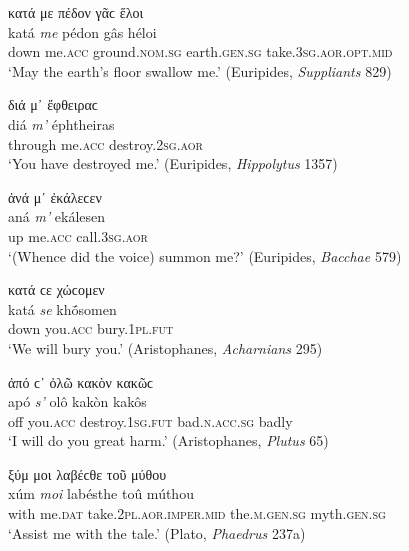 \begin{exe}
\ex κατά με πέδον γᾶϲ ἕλοι\\
\gll katá \emph{me} pédon gâs héloi\\
down me.\textsc{acc} ground.\textsc{nom.sg} earth.\textsc{gen.sg}
take.\textsc{3sg.aor.opt.mid}\\
\trans `May the earth's floor swallow me.' (Euripides, \textit{Suppliants} 829)
\label{tmesis21}
\end{exe}

\begin{exe}
\ex διά μ᾽ ἔφθειραϲ\\
\gll diá \emph{m'} éphtheiras\\
through me.\textsc{acc} destroy.\textsc{2sg.aor}\\
\trans `You have destroyed me.' (Euripides, \textit{Hippolytus} 1357)
\label{tmesis22}
\end{exe}

\begin{exe}
\ex ἀνά μ᾽ ἐκάλεϲεν\\
\gll aná \emph{m'} ekálesen\\
up me.\textsc{acc} call.\textsc{3sg.aor}\\
\trans `(Whence did the voice) summon me?' (Euripides, \textit{Bacchae} 579)
\label{tmesis23}
\end{exe}

\begin{exe}
\ex κατά ϲε χώϲομεν\\
\gll katá \emph{se} khṓsomen\\
down you.\textsc{acc} bury.\textsc{1pl.fut}\\
\trans `We will bury you.' (Aristophanes, \textit{Acharnians} 295)
\label{tmesis24}
\end{exe}

\begin{exe}
\ex ἀπό ϲ᾽ ὀλῶ κακὸν κακῶϲ\\
\gll apó \emph{s'} olô kakòn kakôs\\
off you.\textsc{acc} destroy.\textsc{1sg.fut} bad.\textsc{n.acc.sg} badly\\
\trans `I will do you great harm.' (Aristophanes, \textit{Plutus} 65)
\label{tmesis25}
\end{exe}

\begin{exe}
\ex ξύμ μοι λαβέϲθε τοῦ μύθου\\
\gll xúm \emph{moi} labésthe toû múthou\\
with me.\textsc{dat} take.\textsc{2pl.aor.imper.mid} the.\textsc{m.gen.sg} myth.\textsc{gen.sg}\\
\trans `Assist me with the tale.' (Plato, \textit{Phaedrus} 237a)
\label{tmesis26}
\end{exe}

